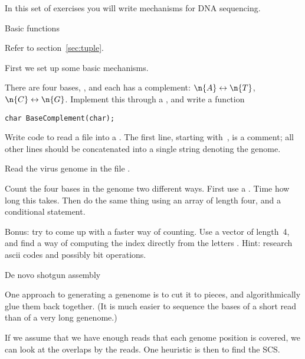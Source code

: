 
In this set of exercises you will write mechanisms for DNA sequencing.

 {Basic functions}

Refer to section~\ref{sec:tuple}.

First we set up some basic mechanisms.

\begin{exercise}
  \label{ex:basecomp}
  There are four bases, , and each has a complement:
  $\n{A}\leftrightarrow\n{T}$, $\n{C}\leftrightarrow\n{G}$.
  Implement this through a , and write a function
\begin{verbatim}
char BaseComplement(char);
\end{verbatim}
\end{exercise}

\begin{exercise}
  \label{ex:basecount}
  Write code to
  read a  file into a .
  The first line, starting with~\n{>}, is a comment; all other lines
  should be concatenated into a single string denoting the genome.
  
  Read the virus genome in the file .

  Count the four bases in the genome two different ways.  First use a
  .  Time how long this takes. Then do the same thing using an
  array of length four, and a conditional statement.

  Bonus: try to come up with a faster way of counting. Use a vector of
  length~4, and find a way of computing the index directly from the
  letters . Hint: research ascii codes and possibly bit operations.
\end{exercise}

 {De novo shotgun assembly}

One approach to generating a genenome is to cut it to pieces,
and algorithmically glue them back together.
(It is much easier to sequence the bases of a short read
than of a very long genenome.)

If we assume that we have enough reads that each
genome position is covered, we can look at
the overlaps by the reads.
One heuristic is then to find the \acf{SCS}.

